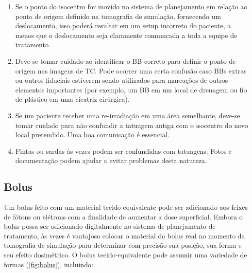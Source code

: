 \documentclass[11pt,a4paper]{article}
\newcounter{exemplo}
\begin{document}
	\begin{enumerate}[label=\textcolor{CarnationPink}{(\arabic*)}]
		\item Se o ponto do isocentro for movido no sistema de planejamento em relação ao ponto de origem definido na tomografia de simulação, fornecendo um deslocamento, isso poderá resultar em um setup incorreto do paciente, a menos que o deslocamento seja claramente comunicada a toda a equipe de tratamento.
		\item Deve-se tomar cuidado ao identificar o BB correto para definir o ponto de origem nas imagens de TC. Pode ocorrer uma certa confusão caso BBs extras ou outros fiduciais estiverem sendo utilizados para marcações de outros elementos importantes (por exemplo, um BB em um local de drenagem ou fio de plástico em uma cicatriz cirúrgica).
		\item Se um paciente receber uma re-irradiação em uma área semelhante, deve-se tomar cuidado para não confundir a tatuagem antiga com o isocentro do novo local pretendido. Uma boa comunicação é essencial.
		\item Pintas ou sardas às vezes podem ser confundidas com tatuagens. Fotos e documentação podem ajudar a evitar problemas desta natureza.
	\end{enumerate}

\subsection*{Bolus}

	Um bolus feito com um material tecido-equivalente pode ser adicionado aos feixes de fótons ou elétrons com a finalidade de aumentar a dose superficial. Embora o bolus possa ser adicionado digitalmente no sistema de planejamento de tratamento, às vezes é vantajoso colocar o material do bolus real no momento da tomografia de simulação para determinar com precisão sua posição, sua forma e seu efeito dosimétrico. O bolus tecido-equivalente pode assumir uma variedade de formas (\ref{fig:bolus}), incluindo:
\end{document}
